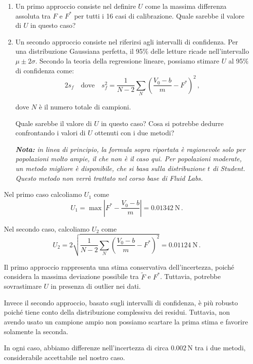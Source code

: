 \begin{itemize}
\begin{enumerate}
\item Un primo approccio consiste nel definire \( U \) come la massima differenza assoluta tra \( F \) e \( F^* \) per tutti i 16 casi di calibrazione. Quale sarebbe il valore di \( U \) in questo caso?

\item Un secondo approccio consiste nel riferirsi agli intervalli di confidenza. Per una distribuzione Gaussiana perfetta, il 95\% delle letture ricade nell'intervallo \( \mu \pm 2\sigma \). Secondo la teoria della regressione lineare, possiamo stimare \( U \) al 95\% di confidenza come:
\begin{equation}
\label{eq:gasu}
2s_f \quad \text{dove} \quad s_f^2 = \frac{1}{N-2} \sum_N \left( \frac{V_0 - b}{m} - F^* \right)^2\,,
\end{equation}

dove \( N \) è il numero totale di campioni.

Quale sarebbe il valore di \( U \) in questo caso? Cosa si potrebbe dedurre confrontando i valori di \( U \) ottenuti con i due metodi?

\emph{\textbf{Nota:} in linea di principio, la formula sopra riportata è ragionevole solo per popolazioni molto ampie, il che non è il caso qui. Per popolazioni moderate, un metodo migliore è disponibile, che si basa sulla distribuzione $t$ di Student. Questo metodo non verrà trattato nel corso base di Fluid Labs.}

\end{enumerate}

\NotionDivider

Nel primo caso calcoliamo $U_1$ come
\begin{equation}
\label{eq:UUU}
U_1=\max \left| F^*- \frac{V_0-b}{m}  \right|=0.01342~\text{N}\,.
\end{equation}

Nel secondo caso, calcoliamo $U_2$ come
\begin{equation}
\label{eq:UUUUU}
U_2=2\sqrt{\frac{1}{N-2} \sum_N \left( \frac{V_0 - b}{m} - F^* \right)^2}=0.01124~\text{N}\,.
\end{equation}

Il primo approccio rappresenta una stima conservativa dell'incertezza, poiché considera la massima deviazione possibile tra \( \tilde{F} \) e \( F^* \). Tuttavia, potrebbe sovrastimare \( U \) in presenza di outlier nei dati.

Invece il secondo approccio, basato sugli intervalli di confidenza, è più robusto poiché tiene conto della distribuzione complessiva dei residui. Tuttavia, non avendo usato un campione ampio non possiamo scartare la prima stima e favorire solamente la seconda.

In ogni caso, abbiamo differenze nell'incertezza di circa \( 0.002 \, \text{N} \) tra i due metodi, considerabile accettabile nel nostro caso.
\end{itemize}

